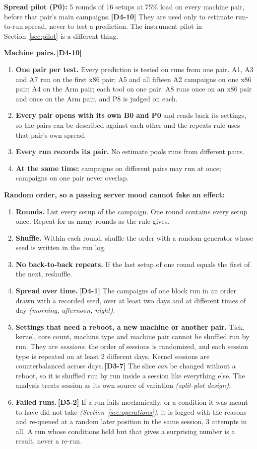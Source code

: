 \documentclass[11pt]{article}
\newcommand{\gl}[1]{{\color{soft}\itshape\small (#1)}}
\newcommand{\chgold}[1]{\,{\color{oldcol}\bfseries\footnotesize[#1]}}
\begin{document}
\textbf{Spread pilot (P0):} 5 rounds of 16 setups at 75\% load on every machine pair, before that pair's main campaigns.\chgold{D4-10} They are used only to estimate run-to-run spread, never to test a prediction. The instrument pilot in Section~\ref{sec:pilot} is a different thing.

\textbf{Machine pairs.}\chgold{D4-10}
\begin{enumerate}
  \item \textbf{One pair per test.} Every prediction is tested on runs from one pair. A1, A3 and A7 run on the first x86 pair; A5 and all fifteen A2 campaigns on one x86 pair; A4 on the Arm pair; each tool on one pair. A8 runs once on an x86 pair and once on the Arm pair, and P8 is judged on each.
  \item \textbf{Every pair opens with its own B0 and P0} and reads back its settings, so the pairs can be described against each other and the repeats rule uses that pair's own spread.
  \item \textbf{Every run records its pair.} No estimate pools runs from different pairs.
  \item \textbf{At the same time:} campaigns on different pairs may run at once; campaigns on one pair never overlap.
\end{enumerate}

\textbf{Random order, so a passing server mood cannot fake an effect:}
\begin{enumerate}
  \item \textbf{Rounds.} List every setup of the campaign. One round contains every setup once. Repeat for as many rounds as the rule gives.
  \item \textbf{Shuffle.} Within each round, shuffle the order with a random generator whose seed is written in the run log.
  \item \textbf{No back-to-back repeats.} If the last setup of one round equals the first of the next, reshuffle.
  \item \textbf{Spread over time.}\chgold{D4-1} The campaigns of one block run in an order drawn with a recorded seed, over at least two days and at different times of day \gl{morning, afternoon, night}.
  \item \textbf{Settings that need a reboot, a new machine or another pair.} Tick, kernel, core count, machine type and machine pair cannot be shuffled run by run. They are \emph{sessions}: the order of sessions is randomized, and each session type is repeated on at least 2 different days. Kernel sessions are counterbalanced across days.\chgold{D3-7} The slice \emph{can} be changed without a reboot, so it is shuffled run by run inside a session like everything else. The analysis treats session as its own source of variation \gl{split-plot design}.
  \item \textbf{Failed runs.}\chgold{D5-2} If a run fails mechanically, or a condition it was meant to have did not take \gl{Section~\ref{sec:operations}}, it is logged with the reasons and re-queued at a random later position in the same session, 3 attempts in all. A run whose conditions held but that gives a surprising number is a result, never a re-run.
\end{enumerate}
\end{document}

